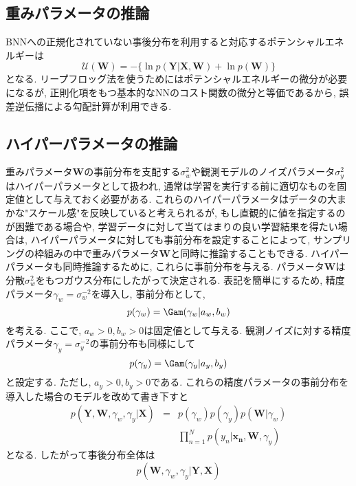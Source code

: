 \documentclass[twocolumn]{jarticle}
\begin{document}
\subsection{重みパラメータの推論}
BNNへの正規化されていない事後分布を利用すると対応するポテンシャルエネルギーは
\begin{equation}
  \mathcal{U}(\bm {W}) = - \{\ln p(\bm {Y|X, W}) + \ln p (\bm {W})\}
\end{equation}
となる. リープフロッグ法を使うためにはポテンシャルエネルギーの微分が必要になるが, 正則化項をもつ基本的なNNのコスト関数の微分と等価であるから, 誤差逆伝播による勾配計算が利用できる.

\subsection{ハイパーパラメータの推論}
重みパラメータ${\bm {W}}$の事前分布を支配する${\sigma_w^2}$や観測モデルのノイズパラメータ${\sigma_y^2}$はハイパーパラメータとして扱われ, 通常は学習を実行する前に適切なものを固定値として与えておく必要がある. これらのハイパーパラメータはデータの大まかな"スケール感"を反映していると考えられるが, もし直観的に値を指定するのが困難である場合や, 学習データに対して当てはまりの良い学習結果を得たい場合は, ハイパーパラメータに対しても事前分布を設定することによって, サンプリングの枠組みの中で重みパラメータ${\bm {W}}$と同時に推論することもできる.
ハイパーパラメータも同時推論するために, これらに事前分布を与える. パラメータ${\bm {W}}$は分散${\sigma_w^2}$をもつガウス分布にしたがって決定される. 表記を簡単にするため, 精度パラメータ${\gamma_w = \sigma_w^{-2}}$を導入し, 事前分布として,
\begin{equation}
  p(\gamma_w) = \Gam (\gamma_w | a_w, b_w)
\end{equation}
を考える. ここで, ${a_w > 0, b_w > 0}$は固定値として与える. 観測ノイズに対する精度パラメータ${\gamma_y = \sigma_y^{-2}}$の事前分布も同様にして
\begin{equation}
  p(\gamma _y) = \Gam (\gamma_y|a_y, b_y)
\end{equation}
と設定する. ただし, ${a_y > 0, b_y > 0}$である.
これらの精度パラメータの事前分布を導入した場合のモデルを改めて書き下すと
\begin{eqnarray}
  p(\bm {Y, W}, \gamma_w, \gamma_y | \bm {X}) &=& p(\gamma_w)p(\gamma_y)p(\bm {W} | \gamma_w) \nonumber \\
  && \prod _{n = 1}^{N} p(y_n|\bm {x_n, W}, \gamma_y)
\end{eqnarray}
となる. したがって事後分布全体は
\begin{equation}
  p(\bm {W}, \gamma_w, \gamma_y | \bm {Y, X})
\end{equation}
\end{document}
